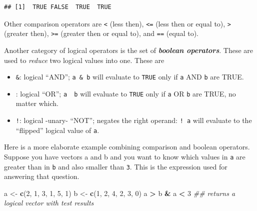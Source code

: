 \documentclass[]{book}
\newenvironment{Shaded}{\begin{snugshade}}{\end{snugshade}}
\newcommand{\CommentTok}[1]{\textcolor[rgb]{0.56,0.35,0.01}{\textit{#1}}}
\newcommand{\DecValTok}[1]{\textcolor[rgb]{0.00,0.00,0.81}{#1}}
\newcommand{\KeywordTok}[1]{\textcolor[rgb]{0.13,0.29,0.53}{\textbf{#1}}}
\newcommand{\NormalTok}[1]{#1}
\newcommand{\OperatorTok}[1]{\textcolor[rgb]{0.81,0.36,0.00}{\textbf{#1}}}
\newcommand{\StringTok}[1]{\textcolor[rgb]{0.31,0.60,0.02}{#1}}
\providecommand{\tightlist}{%
  \setlength{\itemsep}{0pt}\setlength{\parskip}{0pt}}
\begin{document}
\begin{verbatim}
## [1]  TRUE FALSE  TRUE  TRUE
\end{verbatim}

Other comparison operators are \texttt{\textless{}} (less then), \texttt{\textless{}=} (less then or equal to), \texttt{\textgreater{}} (greater then), \texttt{\textgreater{}=} (greater then or equal to), and \texttt{==} (equal to).

Another category of logical operators is the set of \textbf{\emph{boolean operators}}. These are used to \emph{reduce} two logical values into one. These are

\begin{itemize}
\tightlist
\item
  \texttt{\&}: logical ``AND''; \texttt{a\ \&\ b} will evaluate to \texttt{TRUE} only if \texttt{a} AND \texttt{b} are TRUE.\\
\item
  \texttt{\textbar{}}: logical ``OR''; \texttt{a\ \textbar{}\ b} will evaluate to \texttt{TRUE} only if \texttt{a} OR \texttt{b} are TRUE, no matter which.
\item
  \texttt{!}: logical -unary- ``NOT''; negates the right operand: \texttt{!\ a} will evaluate to the ``flipped'' logical value of \texttt{a}.
\end{itemize}

Here is a more elaborate example combining comparison and boolean operators.
Suppose you have vectors a and b and you want to know which values in \texttt{a} are greater than in \texttt{b} and also smaller than \texttt{3}. This is the expression used for answering that question.

\begin{Shaded}
\begin{Highlighting}[]
\NormalTok{a <-}\StringTok{ }\KeywordTok{c}\NormalTok{(}\DecValTok{2}\NormalTok{, }\DecValTok{1}\NormalTok{, }\DecValTok{3}\NormalTok{, }\DecValTok{1}\NormalTok{, }\DecValTok{5}\NormalTok{, }\DecValTok{1}\NormalTok{)}
\NormalTok{b <-}\StringTok{ }\KeywordTok{c}\NormalTok{(}\DecValTok{1}\NormalTok{, }\DecValTok{2}\NormalTok{, }\DecValTok{4}\NormalTok{, }\DecValTok{2}\NormalTok{, }\DecValTok{3}\NormalTok{, }\DecValTok{0}\NormalTok{)}
\NormalTok{a }\OperatorTok{>}\StringTok{ }\NormalTok{b }\OperatorTok{&}\StringTok{ }\NormalTok{a }\OperatorTok{<}\StringTok{ }\DecValTok{3} \CommentTok{## returns a logical vector with test results}
\end{Highlighting}
\end{Shaded}
\end{document}
